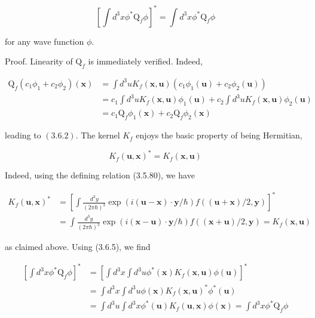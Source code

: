 \documentclass{article}
\begin{document}
\begin{equation*}
\left[\int d^{3} x \phi^{*} \mathrm{Q}_{f} \phi\right]^{*}=\int d^{3} x \phi^{*} \mathrm{Q}_{f} \phi \tag{3.6.3}
\end{equation*}
 
for any wave function $\phi$.

Proof. Linearity of $\mathrm{Q}_{f}$ is immediately verified. Indeed,
 
\begin{align*}
\mathrm{Q}_{f}\left(c_{1} \phi_{1}+c_{2} \phi_{2}\right)(\boldsymbol{x}) & =\int d^{3} u K_{f}(\boldsymbol{x}, \boldsymbol{u})\left(c_{1} \phi_{1}(\boldsymbol{u})+c_{2} \phi_{2}(\boldsymbol{u})\right)  \tag{3.6.4}\\
& =c_{1} \int d^{3} u K_{f}(\boldsymbol{x}, \boldsymbol{u}) \phi_{1}(\boldsymbol{u})+c_{2} \int d^{3} u K_{f}(\boldsymbol{x}, \boldsymbol{u}) \phi_{2}(\boldsymbol{u}) \\
& =c_{1} \mathrm{Q}_{f} \phi_{1}(\boldsymbol{x})+c_{2} \mathrm{Q}_{f} \phi_{2}(\boldsymbol{x})
\end{align*}
 
leading to $(3.6 .2)$.
The kernel $K_{f}$ enjoys the basic property of being Hermitian,
 
\begin{equation*}
K_{f}(\boldsymbol{u}, \boldsymbol{x})^{*}=K_{f}(\boldsymbol{x}, \boldsymbol{u}) \tag{3.6.5}
\end{equation*}
 

Indeed, using the defining relation (3.5.80), we have
 
\begin{align*}
K_{f}(\boldsymbol{u}, \boldsymbol{x})^{*} & =\left[\int \frac{d^{3} y}{(2 \pi \hbar)^{3}} \exp (i(\boldsymbol{u}-\boldsymbol{x}) \cdot \boldsymbol{y} / \hbar) f((\boldsymbol{u}+\boldsymbol{x}) / 2, \boldsymbol{y})\right]^{*}  \tag{3.6.6}\\
& =\int \frac{d^{3} y}{(2 \pi \hbar)^{3}} \exp (i(\boldsymbol{x}-\boldsymbol{u}) \cdot \boldsymbol{y} / \hbar) f((\boldsymbol{x}+\boldsymbol{u}) / 2, \boldsymbol{y})=K_{f}(\boldsymbol{x}, \boldsymbol{u})
\end{align*}
 
as claimed above. Using (3.6.5), we find
 
\begin{align*}
{\left[\int d^{3} x \phi^{*} \mathrm{Q}_{f} \phi\right]^{*} } & =\left[\int d^{3} x \int d^{3} u \phi^{*}(\boldsymbol{x}) K_{f}(\boldsymbol{x}, \boldsymbol{u}) \phi(\boldsymbol{u})\right]^{*}  \tag{3.6.7}\\
& =\int d^{3} x \int d^{3} u \phi(\boldsymbol{x}) K_{f}(\boldsymbol{x}, \boldsymbol{u})^{*} \phi^{*}(\boldsymbol{u}) \\
& =\int d^{3} u \int d^{3} x \phi^{*}(\boldsymbol{u}) K_{f}(\boldsymbol{u}, \boldsymbol{x}) \phi(\boldsymbol{x})=\int d^{3} x \phi^{*} \mathrm{Q}_{f} \phi
\end{align*}
 
\end{document}
